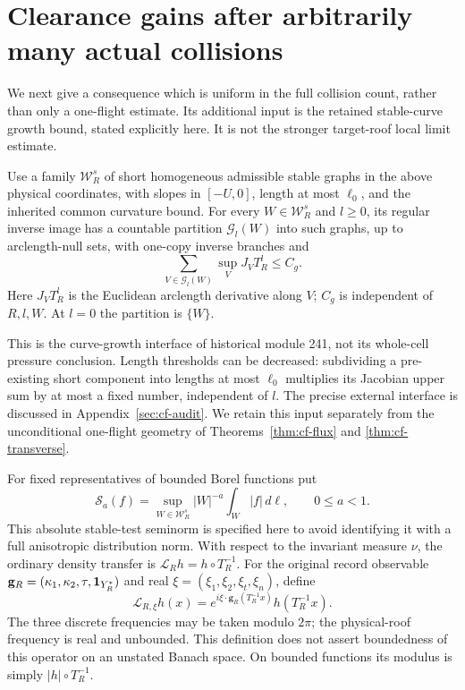 \section{Clearance gains after arbitrarily many actual collisions}
\label{sec:cf-transfer}
We next give a consequence which is uniform in the full collision
count, rather than only a one-flight estimate. Its additional input
is the retained stable-curve growth bound, stated explicitly here.
It is not the stronger target-roof local limit estimate.

\begin{inputstatement}
\label{input:cf-growth}
Use a family $\mathcal W_R^s$ of short homogeneous admissible stable
graphs in the above physical coordinates, with slopes in $[-U,0]$,
length at most $\ell_0$, and the inherited common curvature bound.
For every $W\in\mathcal W_R^s$ and $l\ge0$, its regular inverse
image has a countable partition $\mathcal G_l(W)$ into such graphs,
up to arclength-null sets, with one-copy inverse branches and
\begin{equation}\label{eq:cf-growth}
 \sum_{V\in\mathcal G_l(W)}\sup_V J_VT_R^l\le C_g.
\end{equation}
Here $J_VT_R^l$ is the Euclidean arclength derivative along $V$;
$C_g$ is independent of $R,l,W$. At $l=0$ the partition is $\{W\}$.
\end{inputstatement}
This is the curve-growth interface of historical module 241, not its
whole-cell pressure conclusion. Length thresholds can be decreased:
subdividing a pre-existing short component into lengths at most
$\ell_0$ multiplies its Jacobian upper sum by at most a fixed number,
independent of $l$. The precise external interface is discussed in
Appendix~\ref{sec:cf-audit}. We retain this input separately from the
unconditional one-flight geometry of
Theorems~\ref{thm:cf-flux} and \ref{thm:cf-transverse}.

For fixed representatives of bounded Borel functions put
\[
 \mathcal S_a(f)=\sup_{W\in\mathcal W_R^s}
       |W|^{-a}\int_W|f|\,d\ell,\qquad 0\le a<1.
\]
This absolute stable-test seminorm is specified here to avoid
identifying it with a full anisotropic distribution norm. With respect
to the invariant measure $\nu$, the ordinary density transfer is
$\mathcal L_Rh=h\circ T_R^{-1}$. For the original record observable
$\mathbf g_R=(\kappa_1,\kappa_2,\tau,\mathbf1_{Y_R^*})$ and real
$\xi=(\xi_1,\xi_2,\xi_t,\xi_n)$, define
\[
 \mathcal L_{R,\xi}h(x)=
 e^{i\xi\cdot\mathbf g_R(T_R^{-1}x)}h(T_R^{-1}x).
\]
The three discrete frequencies may be taken modulo $2\pi$; the
physical-roof frequency is real and unbounded. This definition does
not assert boundedness of this operator on an unstated Banach space.
On bounded functions its modulus is simply $|h|\circ T_R^{-1}$.


